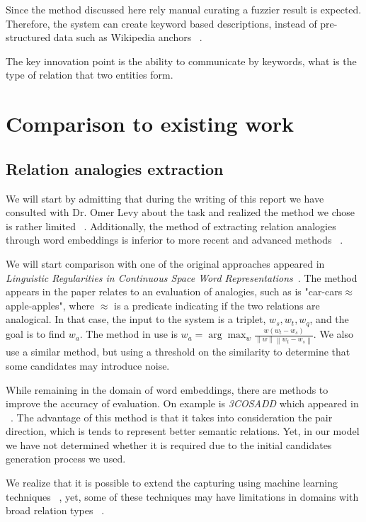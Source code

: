 \documentclass[11pt,a4paper]{article}
\newcommand{\norm}[1]{\left\lVert#1\right\rVert}
\begin{document}
Since the method discussed here rely manual curating a fuzzier result is expected. Therefore, the system can create keyword based descriptions, instead of pre-structured data such as Wikipedia anchors ~\cite{wang2014knowledge}.

The key innovation point is the ability to communicate by keywords, what is the type of relation that two entities form.

\section{Comparison to existing work}

\subsection{Relation analogies extraction}

We will start by admitting that during the writing of this report we have consulted with Dr. Omer Levy about the task and realized the method we chose is rather limited ~\cite{linzen2016issues}. Additionally, the method of extracting relation analogies through word embeddings is inferior to more recent and advanced methods ~\cite{drozd2016word}.

We will start comparison with one of the original approaches appeared in \textit{Linguistic Regularities in Continuous Space Word Representations}~\cite{mikolov2013linguistic}. The method appears in the paper relates to an evaluation of analogies, such as is "car-cars$\approx$apple-apples", where $\approx$ is a predicate indicating if the two relations are analogical. In that case, the input to the system is a triplet, $w_s,w_t,w_q$, and the goal is to find $w_a$. The method in use is $w_a = \arg \max_w \frac{w \left(w_t-w_s\right)}{\norm{w}\norm{w_t-w_s}}$. We also use a similar method, but using a threshold on the similarity to determine that some candidates may introduce noise.

While remaining in the domain of word embeddings, there are methods to improve the accuracy of evaluation. On example is \textit{3COSADD} which appeared in ~\cite{levy2014linguistic}. The advantage of this method is that it takes into consideration the pair direction, which is tends to represent better semantic relations. Yet, in our model we have not determined whether it is required due to the initial candidates generation process we used.

We realize that it is possible to extend the capturing using machine learning techniques ~\cite{drozd2016word}, yet, some of these techniques may have limitations in domains with broad relation types ~\cite{levy2015supervised}.
\end{document}
